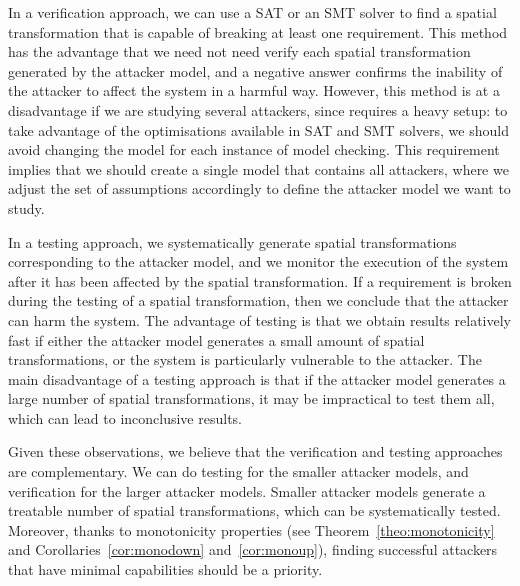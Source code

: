 In a verification approach, we can use a SAT or an SMT solver to find a spatial transformation that is capable of breaking at least one requirement. This method has the advantage that we need not need verify each spatial transformation generated by the attacker model, and a negative answer confirms the inability of the attacker to affect the system in a harmful way. However, this method is at a disadvantage if we are studying several attackers, since requires a heavy setup: to take advantage of the optimisations available in SAT and SMT solvers, we should avoid changing the model for each instance of model checking. This requirement implies that we should create a single model that contains all attackers, where we adjust the set of assumptions accordingly to define the attacker model we want to study. 

In a testing approach, we systematically generate spatial transformations corresponding to the attacker model, and we monitor the execution of the system after it has been affected by the spatial transformation. If a requirement is broken during the testing of a spatial transformation, then we conclude that the attacker can harm the system. The advantage of testing is that we obtain results relatively fast if either the attacker model generates a small amount of spatial transformations, or the system is particularly vulnerable to the attacker. The main disadvantage of a testing approach is that if the attacker model generates a large number of spatial transformations, it may be impractical to test them all, which can lead to inconclusive results.

Given these observations, we believe that the verification and testing approaches are complementary. We can do testing for the smaller attacker models, and verification for the larger attacker models. Smaller attacker models generate a treatable number of spatial transformations, which can be systematically tested. Moreover, thanks to monotonicity properties (see Theorem~\ref{theo:monotonicity} and Corollaries~\ref{cor:monodown} and~\ref{cor:monoup}), finding successful attackers that have minimal capabilities should be a priority. %

